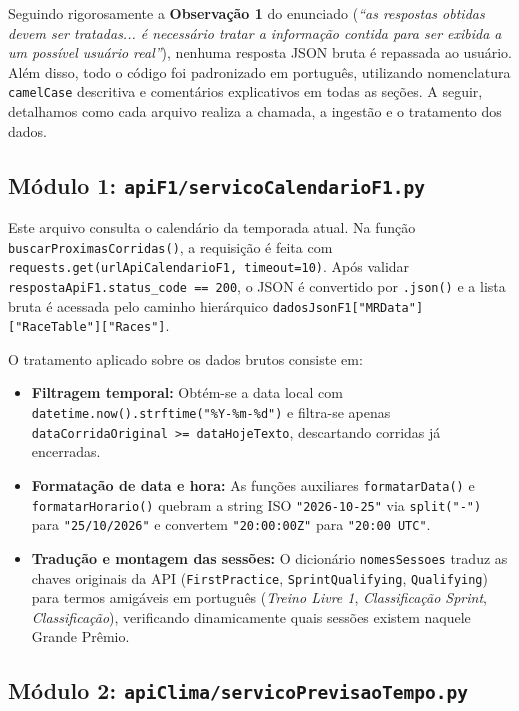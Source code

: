 \documentclass[12pt]{article}
\begin{document}
Seguindo rigorosamente a \textbf{Observação 1} do enunciado (\textit{``as respostas obtidas devem ser tratadas... é necessário tratar a informação contida para ser exibida a um possível usuário real''}), nenhuma resposta JSON bruta é repassada ao usuário. Além disso, todo o código foi padronizado em português, utilizando nomenclatura \texttt{camelCase} descritiva e comentários explicativos em todas as seções. A seguir, detalhamos como cada arquivo realiza a chamada, a ingestão e o tratamento dos dados.

\subsection{Módulo 1: \texttt{apiF1/servicoCalendarioF1.py}}

Este arquivo consulta o calendário da temporada atual. Na função \texttt{buscarProximasCorridas()}, a requisição é feita com \texttt{requests.get(urlApiCalendarioF1, timeout=10)}. Após validar \texttt{respostaApiF1.status\_code == 200}, o JSON é convertido por \texttt{.json()} e a lista bruta é acessada pelo caminho hierárquico \texttt{dadosJsonF1["MRData"]["RaceTable"]["Races"]}.

O tratamento aplicado sobre os dados brutos consiste em:
\begin{itemize}
    \item \textbf{Filtragem temporal:} Obtém-se a data local com \texttt{datetime.now().strftime("\%Y-\%m-\%d")} e filtra-se apenas \texttt{dataCorridaOriginal >= dataHojeTexto}, descartando corridas já encerradas.
    \item \textbf{Formatação de data e hora:} As funções auxiliares \texttt{formatarData()} e \texttt{formatarHorario()} quebram a string ISO \texttt{"2026-10-25"} via \texttt{split("-")} para \texttt{"25/10/2026"} e convertem \texttt{"20:00:00Z"} para \texttt{"20:00 UTC"}.
    \item \textbf{Tradução e montagem das sessões:} O dicionário \texttt{nomesSessoes} traduz as chaves originais da API (\texttt{FirstPractice}, \texttt{SprintQualifying}, \texttt{Qualifying}) para termos amigáveis em português (\textit{Treino Livre 1}, \textit{Classificação Sprint}, \textit{Classificação}), verificando dinamicamente quais sessões existem naquele Grande Prêmio.
\end{itemize}

\subsection{Módulo 2: \texttt{apiClima/servicoPrevisaoTempo.py}}
\end{document}
